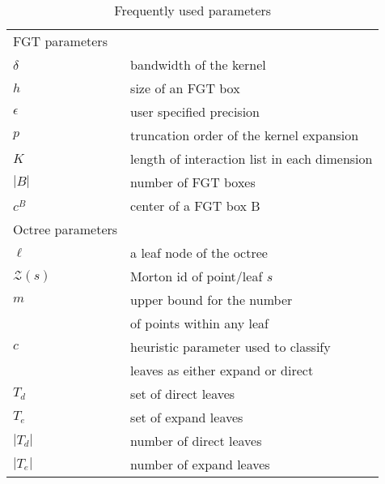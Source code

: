  
\begin{table}[ht!]
\small
\caption{\label{t:notation} Frequently used parameters}
\begin{tabular}{|ll|}
\hline 
FGT parameters &\\
$\delta$                    & bandwidth of the kernel\\
$h$                         & size of an FGT box \\
$\epsilon$                  & user specified precision\\
$p$                         & truncation order of the kernel expansion \\
$K$                         & length of interaction list in each dimension \\
$|B|$                       & number of FGT boxes \\
$c^B$                       & center of a FGT box B \\
\hline 
Octree parameters &\\
$\ell$                       & a leaf node of the octree \\
$\mathcal{Z}(s)$            & Morton id of point/leaf $s$ \\
$m$                         & upper bound for the number \\ 
                            & of points within any leaf \\
$c$                          & heuristic parameter used to classify \\
                            & leaves as either expand or direct \\
$T_d$                       & set of direct leaves \\
$T_e$                       & set of expand leaves \\ 
$|T_d|$                     & number of direct leaves \\ 
$|T_e|$                     & number of expand leaves \\ 
\hline
\end{tabular}
\end{table}

